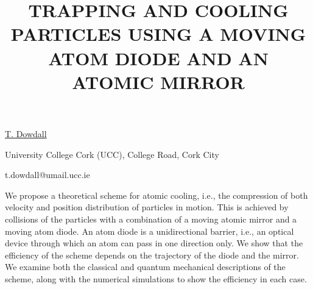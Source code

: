 \title{TRAPPING AND COOLING PARTICLES USING A MOVING ATOM DIODE AND AN ATOMIC MIRROR}

\underline{T. Dowdall} 

{\normalsize{\vspace{-4mm}
University College Cork (UCC),
College Road,
Cork City

\email t.dowdall@umail.ucc.ie}}

We propose a theoretical scheme for atomic cooling, i.e., the compression of both velocity and position
distribution of particles in motion. This is achieved by collisions of the particles with a combination of a moving
atomic mirror and a moving atom diode. An atom diode is a unidirectional barrier, i.e., an optical device through
which an atom can pass in one direction only. We show that the efficiency of the scheme depends on the trajectory
of the diode and the mirror. We examine both the classical and quantum mechanical descriptions of the scheme,
along with the numerical simulations to show the efficiency in each case.

\vspace{\baselineskip}
